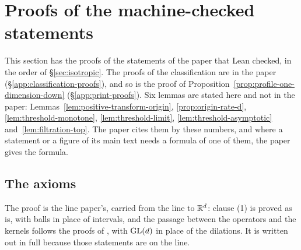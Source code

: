 \section{Proofs of the machine-checked statements}\label{supp:proofs}

This section has the proofs of the statements of the paper that Lean checked, in the order of
\S\ref{sec:isotropic}. The proofs of the classification are in the paper
(\S\ref{app:classification-proofs}), and so is the proof of
Proposition~\ref{prop:profile-one-dimension-down} (\S\ref{app:print-proofs}). Six lemmas are
stated here and not in the paper:
Lemmas~\ref{lem:positive-transform-origin}, \ref{prop:origin-rate-d},
\ref{lem:threshold-monotone}, \ref{lem:threshold-limit}, \ref{lem:threshold-asymptotic}
and~\ref{lem:filtration-top}. The paper cites them by these numbers, and where a statement or
a figure of its main text needs a formula of one of them, the paper gives the formula.

\subsection{The axioms}\label{supp:proofs-axioms}

The proof is the line paper's, carried from the line to $\mathbb{R}^d$: clause (1) is proved as
 is, with balls in place of intervals, and the passage between the operators
and the kernels follows the proofs of , with $\mathrm{GL}(d)$ in place of
the dilations. It is written out in full because those statements are on the line.

